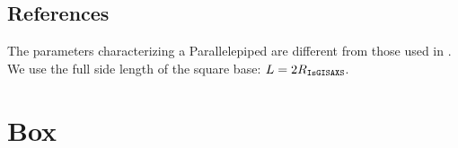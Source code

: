 



\subsection{References}
The parameters characterizing a Parallelepiped are different from
those used in . We use the full side length of the
square base: $L= 2 R_{\rm{\texttt{IsGISAXS}}}$.
\newpage{\cleardoublepage}
\section{Box}  

